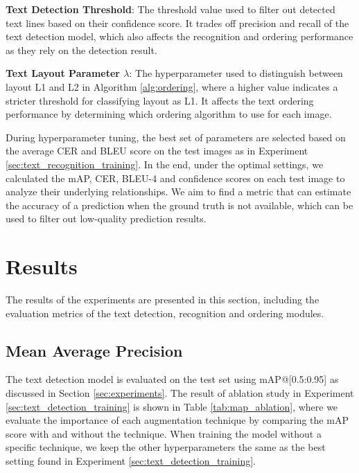 \documentclass[12pt,twoside]{report}
\begin{document}
\textbf{Text Detection Threshold}: The threshold value used to filter out detected text lines based on their confidence score. It trades off precision and recall of the text detection model, which also affects the recognition and ordering performance as they rely on the detection result.

\textbf{Text Layout Parameter $\lambda$}: The hyperparameter used to distinguish between layout L1 and L2 in Algorithm \ref{alg:ordering}, where a higher value indicates a stricter threshold for classifying layout as L1. It affects the text ordering performance by determining which ordering algorithm to use for each image.

During hyperparameter tuning, the best set of parameters are selected based on the average CER and BLEU score on the test images as in Experiment \ref{sec:text_recognition_training}. In the end, under the optimal settings, we calculated the mAP, CER, BLEU-4 and confidence scores on each test image to analyze their underlying relationships. We aim to find a metric that can estimate the accuracy of a prediction when the ground truth is not available, which can be used to filter out low-quality prediction results.

\section{Results}
\label{sec:results}
The results of the experiments are presented in this section, including the evaluation metrics of the text detection, recognition and ordering modules.

\subsection{Mean Average Precision}
\label{sec:map}
The text detection model is evaluated on the test set using mAP@[0.5:0.95] as discussed in Section \ref{sec:experiments}. The result of ablation study in Experiment \ref{sec:text_detection_training} is shown in Table \ref{tab:map_ablation}, where we evaluate the importance of each augmentation technique by comparing the mAP score with and without the technique. When training the model without a specific technique, we keep the other hyperparameters the same as the best setting found in Experiment \ref{sec:text_detection_training}. 
\end{document}
